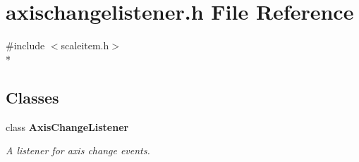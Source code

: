 \section{axischangelistener.\+h File Reference}
\label{bk3_2axischangelistener_8h}
{\ttfamily \#include $<$scaleitem.\+h$>$}\\*
\subsection*{Classes}
\begin{DoxyCompactItemize}
\item 
class {\bf Axis\+Change\+Listener}
\begin{DoxyCompactList}\small\item\em A listener for axis change events. \end{DoxyCompactList}\end{DoxyCompactItemize}
